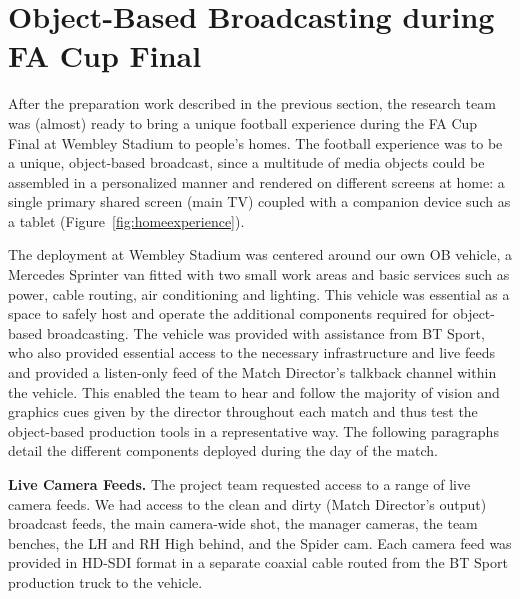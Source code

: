\documentclass[sigchi-a, authorversion]{acmart}
\begin{document}
\section{Object-Based Broadcasting during FA Cup Final}
After the preparation work described in the previous section, the research team
was (almost) ready to bring a unique football experience during the FA Cup Final
at Wembley Stadium to people's homes. The football experience was to be a unique, object-based broadcast, since a
multitude of media objects could be assembled in a personalized manner and rendered on
different screens at home: a single primary shared screen (main TV) coupled with
a companion device such as a tablet (Figure~\ref{fig:homeexperience}).


The deployment at Wembley Stadium was centered around our own OB vehicle, a
Mercedes Sprinter van fitted with two small work areas and basic services
such as power, cable routing, air conditioning and lighting. This vehicle was
essential as a space to safely host and operate the additional components
required for object-based broadcasting. The vehicle was provided with assistance
from BT Sport, who also provided essential access to the necessary infrastructure
and live feeds and provided a listen-only feed of the Match Director's talkback
channel within the vehicle. This enabled the team to hear and follow the
majority of vision and graphics cues given by the director throughout each
match and thus test the object-based production tools in a representative way.
The following paragraphs detail the different components deployed during the day
of the match.

\vspace{5pt}\noindent\textbf{Live Camera Feeds.} The project team requested
access to a range of live camera feeds. We had access to the clean and dirty
(Match Director's output) broadcast feeds, the main camera-wide shot, the
manager cameras, the team benches, the LH and RH High behind, and the Spider
cam. Each camera feed was provided in HD-SDI format in a separate coaxial cable
routed from the BT Sport production truck to the vehicle.
\end{document}

